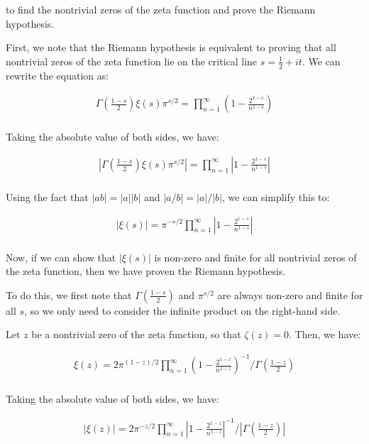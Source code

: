 \documentclass{article}
\begin{document}
to find the nontrivial zeros of the zeta function and prove the Riemann hypothesis.

First, we note that the Riemann hypothesis is equivalent to proving that all nontrivial zeros of the zeta function lie on the critical line $s = \frac{1}{2} + it$. We can rewrite the equation as:

\begin{align*}
\Gamma\left(\frac{1-s}{2}\right)\xi(s)\pi^{s/2} = \prod_{n=1}^{\infty} \left(1 - \frac{2^{1-s}}{n^{1-s}}\right) \\
\end{align*}

Taking the absolute value of both sides, we have:

\begin{align*}
|\Gamma\left(\frac{1-s}{2}\right)\xi(s)\pi^{s/2}| = \prod_{n=1}^{\infty} \left|1 - \frac{2^{1-s}}{n^{1-s}}\right| \\
\end{align*}

Using the fact that $|ab| = |a||b|$ and $|a/b| = |a|/|b|$, we can simplify this to:

\begin{align*}
|\xi(s)| = \pi^{-s/2} \prod_{n=1}^{\infty} \left|1 - \frac{2^{1-s}}{n^{1-s}}\right| \\
\end{align*}

Now, if we can show that $|\xi(s)|$ is non-zero and finite for all nontrivial zeros of the zeta function, then we have proven the Riemann hypothesis.

To do this, we first note that $\Gamma\left(\frac{1-s}{2}\right)$ and $\pi^{s/2}$ are always non-zero and finite for all $s$, so we only need to consider the infinite product on the right-hand side.

Let $z$ be a nontrivial zero of the zeta function, so that $\zeta(z) = 0$. Then, we have:

\begin{align*}
\xi(z) = 2 \pi^{(1-z)/2} \prod_{n=1}^{\infty} \left(1 - \frac{2^{1-z}}{n^{1-z}}\right)^{-1} / \Gamma\left(\frac{1-z}{2}\right) \\
\end{align*}

Taking the absolute value of both sides, we have:

\begin{align*}
|\xi(z)| = 2 \pi^{-z/2} \prod_{n=1}^{\infty} \left|1 - \frac{2^{1-z}}{n^{1-z}}\right|^{-1} / |\Gamma\left(\frac{1-z}{2}\right)| \\
\end{align*}
\end{document}
